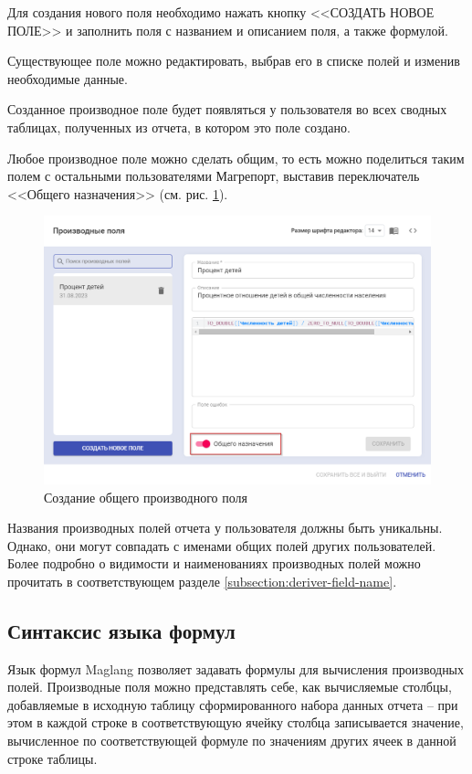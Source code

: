 \documentclass[../user-manual.tex]{subfiles}
\begin{document}
	Для создания нового поля необходимо нажать кнопку <<СОЗДАТЬ НОВОЕ ПОЛЕ>> и заполнить поля с названием и описанием поля, а также формулой. 
	
	Существующее поле можно редактировать, выбрав его в списке полей и изменив необходимые данные.
	
	Созданное производное поле будет появляться у пользователя во всех сводных таблицах, полученных из отчета, в котором это поле создано.
	
	Любое производное поле можно сделать общим, то есть можно поделиться таким полем с остальными пользователями Магрепорт, выставив переключатель <<Общего назначения>> (см. рис. \ref{fig:derived_fields_share}). 
	
	\begin{figure}[h]
		\centering
		\includegraphics[width=\graphicswidth]{img/32-derived_fields_share.png}
		\caption{Создание общего производного поля}
		\label{fig:derived_fields_share}
	\end{figure}

	Названия производных полей отчета у пользователя должны быть уникальны. Однако, они могут совпадать с именами общих полей других пользователей. Более подробно о видимости и наименованиях производных полей можно прочитать в соответствующем разделе \ref{subsection:deriver-field-name}.
	
	\subsection{Синтаксис языка формул}	
	
	Язык формул Maglang позволяет задавать формулы для вычисления производных полей. Производные поля можно представлять себе, как вычисляемые столбцы, добавляемые в исходную таблицу сформированного набора данных отчета -- при этом в каждой строке в соответствующую ячейку столбца записывается значение, вычисленное по соответствующей формуле по значениям других ячеек в данной строке таблицы. 
	
\end{document}
